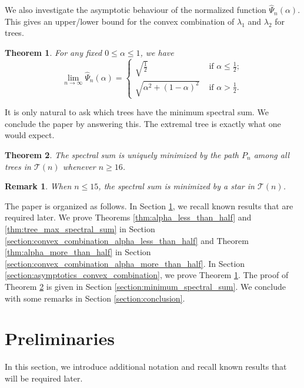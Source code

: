 \documentclass[11pt]{article}
\theoremstyle{plain}
\newtheorem{theorem}{Theorem}[section]
\newtheorem*{remark}{Remark}
\numberwithin{equation}{section}
\begin{document}
We also investigate the asymptotic behaviour of the normalized function $\hat{\Psi}_n(\alpha)$. This gives an upper/lower bound for the convex combination of $\lambda_1$ and $\lambda_2$ for trees. 

\begin{theorem}\label{thm:asymptotic_convex_combination}
    For any fixed $0\le \alpha \le 1$, we have 
    \[ \lim_{n\rightarrow \infty} \hat{\Psi}_n(\alpha) = 
    \begin{cases}
    \sqrt{\frac{1}{2}} & \text{ if }\alpha \le \frac{1}{2};\\
    \sqrt{\alpha^2 + (1-\alpha)^2} & \text{ if }\alpha > \frac{1}{2}.
    \end{cases}\]
\end{theorem}

It is only natural to ask which trees have the minimum spectral sum. 
We conclude the paper by answering this. The extremal tree is exactly what one would expect. 

\begin{theorem}\label{thm:spectral_sum_min_trees}
The spectral sum is uniquely minimized by the path $P_n$ among all trees in $\mathcal{T}(n)$ whenever $n\ge 16$.
\end{theorem}

\begin{remark}
    When $n\le 15$, the spectral sum is minimized by a star in $\mathcal{T}(n)$.
\end{remark} 

The paper is organized as follows. In Section \ref{section:preliminaries}, we recall known results that are required later. We prove Theorems \ref{thm:alpha_less_than_half} and \ref{thm:tree_max_spectral_sum} in Section \ref{section:convex_combination_alpha_less_than_half} and Theorem  \ref{thm:alpha_more_than_half} in Section \ref{section:convex_combination_alpha_more_than_half}. In Section \ref{section:asymptotics_convex_combination}, we prove Theorem \ref{thm:asymptotic_convex_combination}. The proof of Theorem \ref{thm:spectral_sum_min_trees} is given in Section \ref{section:minimum_spectral_sum}. We conclude with some remarks in Section \ref{section:conclusion}.

\section{Preliminaries}
\label{section:preliminaries}

In this section, we introduce additional notation and recall known results that will be required later. 
\end{document}
